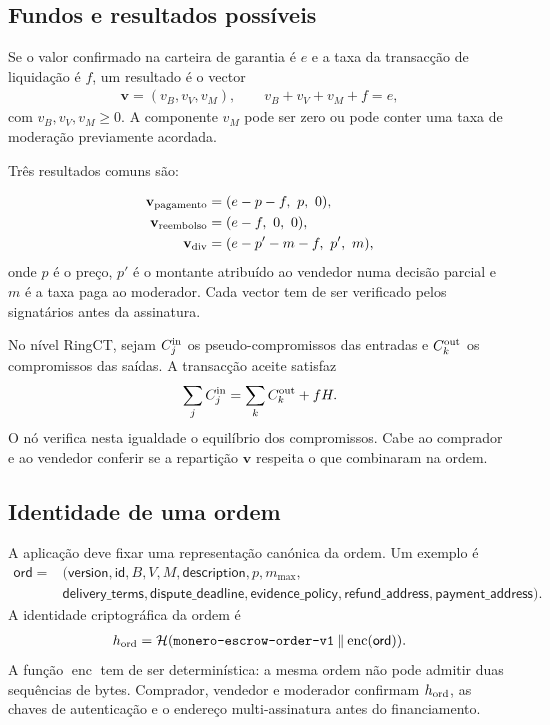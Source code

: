 \subsection{Fundos e resultados possíveis}

Se o valor confirmado na carteira de garantia é \(e\) e a taxa da
transacção de liquidação é \(f\), um resultado é o vector
\begin{align}
 \mathbf v=(v_B,v_V,v_M),
 \qquad
 v_B+v_V+v_M+f=e,
 \label{eq:escrow-value-allocation}
\end{align}
com \(v_B,v_V,v_M\geq0\). A componente \(v_M\) pode ser zero ou pode conter
uma taxa de moderação previamente acordada.

Três resultados comuns são:

\begin{align}
 \mathbf v_{\rm pagamento}
   &=(e-p-f,\ p,\ 0),\\
 \mathbf v_{\rm reembolso}
   &=(e-f,\ 0,\ 0),\\
 \mathbf v_{\rm div}
   &=(e-p'-m-f,\ p',\ m),
 \label{eq:escrow-common-outcomes}
\end{align}
onde \(p\) é o preço, \(p'\) é o montante atribuído ao vendedor numa decisão
parcial e \(m\) é a taxa paga ao moderador. Cada vector tem de ser verificado
pelos signatários antes da assinatura.

No nível RingCT, sejam \(C_j^{\rm in}\) os pseudo-compromissos das entradas e
\(C_k^{\rm out}\) os compromissos das saídas. A transacção aceite satisfaz
\begin{align}
 \sum_j C_j^{\rm in}
 =
 \sum_k C_k^{\rm out}+fH.
 \label{eq:escrow-ringct-balance}
\end{align}
O nó verifica nesta igualdade o equilíbrio dos compromissos. Cabe ao
comprador e ao vendedor conferir se a repartição \(\mathbf v\) respeita
o que combinaram na ordem.



\subsection{Identidade de uma ordem}

A aplicação deve fixar uma representação canónica da ordem. Um exemplo é
\begin{align}
 \mathsf{ord}={}&(
 \mathsf{version},\mathsf{id},B,V,M,
 \mathsf{description},p,m_{\max},\\
 &\mathsf{delivery\_terms},
 \mathsf{dispute\_deadline},
 \mathsf{evidence\_policy},
 \mathsf{refund\_address},
 \mathsf{payment\_address}).
 \label{eq:escrow-order-record}
\end{align}
A identidade criptográfica da ordem é
\begin{align}
 h_{\rm ord}
 =\mathcal H(
 \texttt{monero-escrow-order-v1}
 \mathbin\|\operatorname{enc}(\mathsf{ord})).
 \label{eq:escrow-order-hash}
\end{align}
A função \(\operatorname{enc}\) tem de ser determinística: a mesma ordem não
pode admitir duas sequências de bytes. Comprador, vendedor e moderador
confirmam \(h_{\rm ord}\), as chaves de autenticação e o endereço
multi-assinatura antes do financiamento.

